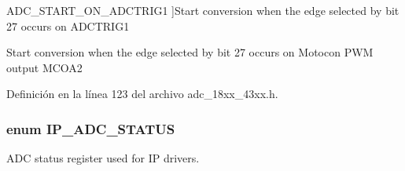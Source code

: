 \begin{Desc}
\begin{description}
{A\+D\+C\+\_\+\+S\+T\+A\+R\+T\+\_\+\+O\+N\+\_\+\+A\+D\+C\+T\+R\+I\+G1\hypertarget{group___a_d_c__18_x_x__43_x_x_gga125e3c848732e5fa6e064354f618f57cac1792ece65ee0108a400412184fca507}{}\label{group___a_d_c__18_x_x__43_x_x_gga125e3c848732e5fa6e064354f618f57cac1792ece65ee0108a400412184fca507}
}]Start conversion when the edge selected by bit 27 occurs on A\+D\+C\+T\+R\+I\+G1 \item[{\em 
A\+D\+C\+\_\+\+S\+T\+A\+R\+T\+\_\+\+O\+N\+\_\+\+M\+C\+O\+A2\hypertarget{group___a_d_c__18_x_x__43_x_x_gga125e3c848732e5fa6e064354f618f57ca390c797ca8e170b65a45eb8f9669dbc9}{}\label{group___a_d_c__18_x_x__43_x_x_gga125e3c848732e5fa6e064354f618f57ca390c797ca8e170b65a45eb8f9669dbc9}
}]Start conversion when the edge selected by bit 27 occurs on Motocon P\+WM output M\+C\+O\+A2 \end{description}
\end{Desc}


Definición en la línea 123 del archivo adc\+\_\+18xx\+\_\+43xx.\+h.

\subsubsection[{\texorpdfstring{I\+P\+\_\+\+A\+D\+C\+\_\+\+S\+T\+A\+T\+US}{IP_ADC_STATUS}}]{\setlength{\rightskip}{0pt plus 5cm}enum {\bf I\+P\+\_\+\+A\+D\+C\+\_\+\+S\+T\+A\+T\+US}}\hypertarget{group___a_d_c__18_x_x__43_x_x_ga4cdc8cd4b1ae4721ff5de44c783f310a}{}\label{group___a_d_c__18_x_x__43_x_x_ga4cdc8cd4b1ae4721ff5de44c783f310a}


A\+DC status register used for IP drivers. 

